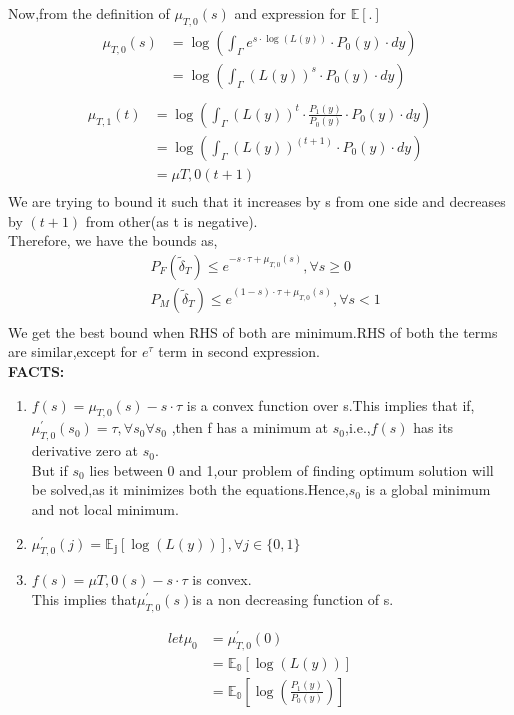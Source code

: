 \documentclass[a4paper,english,12pt]{article}
\begin{document}
Now,from the definition of $\mu_{T,0}(s)$ and expression for $\mathbb{E}[.]$
\begin{align*}
 \mu_{T,0}(s)&=\log\left(\int_{\Gamma}{e^{s\cdot\log(L(y))}\cdot P_0(y)}\cdot dy\right)\\
&= \log\left(\int_{\Gamma}{(L(y))^s\cdot P_0(y)}\cdot dy\right)\\
\end{align*}
\begin{align*}
\mu_{T,1}(t)&=\log\left(\int_{\Gamma}{(L(y))^t\cdot \frac{P_1(y)}{P_0(y)}\cdot P_0(y)}\cdot dy\right)\\
&= \log\left(\int_{\Gamma}{(L(y))^(t+1)\cdot P_0(y)}\cdot dy\right)\\
&=\mu{T,0}(t+1)\\
\end{align*}
We are trying to bound it such that it increases by s from one side and decreases by $(t+1)$ from other(as t is negative).\\
Therefore, we have the bounds as,
\begin{align*}
&P_F(\tilde\delta_T)\leq e^{-s\cdot\tau+\mu_{T,0}(s)},\forall s\geq 0\\
&P_M(\tilde\delta_T)\leq e^{(1-s)\cdot\tau +\mu_{T,0}(s)},\forall s<1\\
\end{align*}
We get the best bound when RHS of both are minimum.RHS of both the terms are similar,except for $e^\tau$ term in second expression.\\
\large \textbf{FACTS:}
\begin{enumerate}
\item $f(s)=\mu_{T,0}(s)-s\cdot \tau$ is a convex function over s.This implies that  if,$\mu^\prime_{T,0}(s_0)=\tau,\forall s_0\forall s_0$ ,then f has a minimum at $s_0$,i.e.,$f(s)$ has its derivative zero at $s_0$.\\But if $s_0$ lies between 0 and 1,our problem of finding optimum solution will be solved,as it minimizes both the equations.Hence,$s_0$ is a global minimum and not local minimum.
\item $\mu^\prime_{T,0} (j)=\mathbb{E_j}[\log(L(y))],\forall j\in \{0,1\}$
\item $f(s)=\mu{T,0}(s)-s\cdot\tau$ is convex.\\This implies that$\mu^\prime_{T,0}(s)$is a non decreasing function of s.
\end{enumerate}
\begin{align*}
let \mu_0 &= \mu^\prime_{T,0}(0)\\&=\mathbb{E_0}[\log(L(y))]\\
&=\mathbb{E_0}\left[\log\left(\frac{P_1(y)}{P_0(y)}\right)\right]\\
\end{align*}
\end{document}
